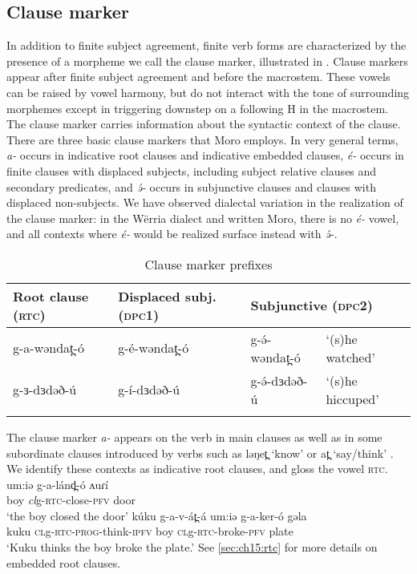 \subsection{Clause marker}\label{sec:ch11:clausemarker}

In addition to finite subject agreement, finite verb forms are characterized by the presence of a morpheme we call the clause marker, illustrated in .  Clause markers appear after finite subject agreement and before the macrostem. These vowels can be raised by vowel harmony, but do not interact with the tone of surrounding morphemes except in triggering downstep on a following H in the macrostem. The clause marker carries information about the syntactic context of the clause. There are three basic clause markers that Moro employs. In very general terms, \textit{a-} occurs in indicative root clauses and indicative embedded clauses, \textit{é-} occurs in finite clauses with displaced subjects, including subject relative clauses and secondary predicates, and \textit{ə́-} occurs in subjunctive clauses and clauses with displaced non-subjects. We have observed dialectal variation in the realization of the clause marker: in the W\"erria dialect and written Moro, there is no \textit{é-} vowel, and all contexts where \textit{é-} would be realized surface instead with  \textit{ə́-}. 

\begin{table}
	\caption{Clause marker prefixes} \label{tab:ch11:clause}
	\begin{tabular}{llll}
	\lsptoprule 
Root clause (\textsc{rtc}) & Displaced subj. (\textsc{dpc1}) & \multicolumn{2}{l}{Subjunctive (\textsc{dpc2}) } \\
\midrule
g-a-wəndat̪-ó  &  g-é-wəndat̪-ó & g-ə́-wəndat̪-ó & `(s)he watched'\\
g-ɜ-dɜdəð-ú	& g-í-dɜdəð-ú &  g-ə́-dɜdəð-ú & `(s)he hiccuped'\\
\lspbottomrule
	\end{tabular}
\end{table}

The clause marker \textit{a-} appears on the verb in main clauses as well as in some subordinate clauses introduced by verbs such as ləŋet̪  ‘know’ or at̪ ‘say/think’  . We identify these contexts as indicative root clauses, and gloss the vowel \textsc{rtc}.
\ea  \label{ex:ch11:rtc}
\ea \gll 	um:iə  g-a-lánd̪-ó             ʌuɾí\\
			boy     \textit{cl}g-\textsc{rtc}-close-\textsc{pfv}		door\\
	\glt		‘the boy closed the door’
\ex \gll	kúku   g-a-v-át̪-á     um:iə    g-a-ker-ó         gəla\\
			kuku    \textsc{cl}g-\textsc{rtc}-\textsc{prog}-think-\textsc{ipfv}  boy       \textsc{cl}g-\textsc{rtc}-broke-\textsc{pfv}   plate\\
	\glt		 `Kuku thinks the boy broke the plate.'
\z 
\z 
See \ref{sec:ch15:rtc} for more details on embedded root clauses.

